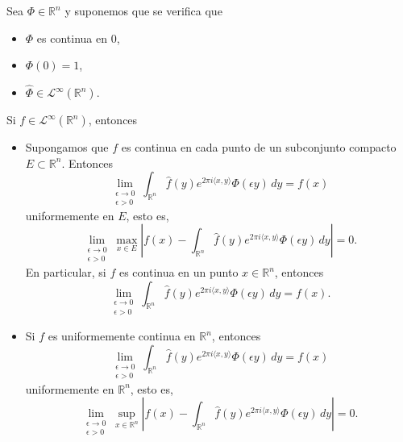 \begin{teorema}\label{teoteoteo}
    Sea $\Phi \in \mathbb{R}^n$ y suponemos que se verifica que
    \begin{itemize}
         \item $\Phi$ es continua en $0$, 
    \item $\Phi(0) = 1$,
    \item $\widehat{\Phi} \in \mathscr{L}^{\infty}(\mathbb{R}^n).$
    \end{itemize}
    Si $f \in \mathscr{L}^{\infty}(\mathbb{R}^n)$, entonces
    \begin{itemize}
        \item Supongamos que $f$ es continua en cada punto de un subconjunto compacto $E \subset \mathbb{R}^n$. Entonces
        \begin{equation}
             \lim_{\substack{\epsilon \rightarrow 0 \\ \epsilon >0}}\int_{\mathbb{R}^n}\widehat{f}(y)e^{2\pi i \langle x, y \rangle} \Phi(\epsilon y) \, dy  = f(x)
        \end{equation}
        uniformemente en $E$, esto es, 
         \begin{equation}
        \lim_{\substack{\epsilon \rightarrow 0 \\ \epsilon > 0}} \max_{x \in E}  \left| f(x) -   \int_{\mathbb{R}^n}\widehat{f}(y)e^{2\pi i \langle x, y \rangle} \Phi(\epsilon y) \, dy \right|  = 0.
    \end{equation}
    En particular, si $f$ es continua en un punto $x \in \mathbb{R}^n$, entonces
    \begin{equation}
             \lim_{\substack{\epsilon \rightarrow 0 \\ \epsilon > 0}}\int_{\mathbb{R}^n}\widehat{f}(y)e^{2\pi i \langle x, y \rangle} \Phi(\epsilon y) \, dy  = f(x). 
        \end{equation}

    \item  Si $f$ es uniformemente continua en $\mathbb{R}^n$, entonces
    \begin{equation}
              \lim_{\substack{\epsilon \rightarrow 0 \\ \epsilon >0}}\int_{\mathbb{R}^n}\widehat{f}(y)e^{2\pi i \langle x, y \rangle} \Phi(\epsilon y) \, dy  = f(x)
        \end{equation}
        uniformemente en $\mathbb{R}^n$,
        esto es, 
         \begin{equation}
        \lim_{\substack{\epsilon \rightarrow 0 \\ \epsilon > 0}} \sup_{x \in \mathbb{R}^n}  \left| f(x) -   \int_{\mathbb{R}^n}\widehat{f}(y)e^{2\pi i \langle x, y \rangle} \Phi(\epsilon y) \, dy \right|   = 0.
    \end{equation}
    \end{itemize}
\end{teorema}
